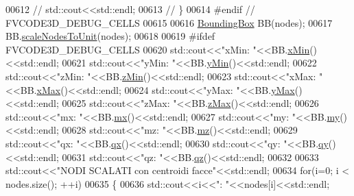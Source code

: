 \begin{DoxyCode}
00612 \textcolor{comment}{//            std::cout<<std::endl;}
00613 \textcolor{comment}{//        \}}
00614 \textcolor{preprocessor}{#endif // FVCODE3D\_DEBUG\_CELLS}
00615 
00616         \hyperlink{classFVCode3D_1_1BoundingBox}{BoundingBox} BB(nodes);
00617         BB.\hyperlink{classFVCode3D_1_1BoundingBox_a20d4281f025fd6a4ee51ec8cbc47874c}{scaleNodesToUnit}(nodes);
00618 
00619 \textcolor{preprocessor}{#ifdef FVCODE3D\_DEBUG\_CELLS}
00620         std::cout<<\textcolor{stringliteral}{"xMin: "}<<BB.\hyperlink{classFVCode3D_1_1BoundingBox_a8406e82493459d67f7c6e01c41401b01}{xMin}()<<std::endl;
00621         std::cout<<\textcolor{stringliteral}{"yMin: "}<<BB.\hyperlink{classFVCode3D_1_1BoundingBox_a8d241063de29672a73e478ccef500fcd}{yMin}()<<std::endl;
00622         std::cout<<\textcolor{stringliteral}{"zMin: "}<<BB.\hyperlink{classFVCode3D_1_1BoundingBox_a332192fde3727b7de1c9864e98659ac1}{zMin}()<<std::endl;
00623         std::cout<<\textcolor{stringliteral}{"xMax: "}<<BB.\hyperlink{classFVCode3D_1_1BoundingBox_a0ba4fbfa989d212c7f9df6b5ee440ef2}{xMax}()<<std::endl;
00624         std::cout<<\textcolor{stringliteral}{"yMax: "}<<BB.\hyperlink{classFVCode3D_1_1BoundingBox_abcec6a60efb3a0bd3333bba6cb8c5eb4}{yMax}()<<std::endl;
00625         std::cout<<\textcolor{stringliteral}{"zMax: "}<<BB.\hyperlink{classFVCode3D_1_1BoundingBox_a9b1fee0fe7324865743f4029dd06e1a3}{zMax}()<<std::endl;
00626         std::cout<<\textcolor{stringliteral}{"mx: "}<<BB.\hyperlink{classFVCode3D_1_1BoundingBox_a2afb68488fb7361595825089c271fa23}{mx}()<<std::endl;
00627         std::cout<<\textcolor{stringliteral}{"my: "}<<BB.\hyperlink{classFVCode3D_1_1BoundingBox_a286722e958824c1798a85a55325d9fe5}{my}()<<std::endl;
00628         std::cout<<\textcolor{stringliteral}{"mz: "}<<BB.\hyperlink{classFVCode3D_1_1BoundingBox_aaff1f6eb030c4f8a15dd22c79a28bf0c}{mz}()<<std::endl;
00629         std::cout<<\textcolor{stringliteral}{"qx: "}<<BB.\hyperlink{classFVCode3D_1_1BoundingBox_a6b6ca1d8e9bc92d6f5eebdb329577530}{qx}()<<std::endl;
00630         std::cout<<\textcolor{stringliteral}{"qy: "}<<BB.\hyperlink{classFVCode3D_1_1BoundingBox_ae429d21fd242df838ed0343757eba744}{qy}()<<std::endl;
00631         std::cout<<\textcolor{stringliteral}{"qz: "}<<BB.\hyperlink{classFVCode3D_1_1BoundingBox_accc6026eaa331a6075805479b60141f4}{qz}()<<std::endl;
00632 
00633         std::cout<<\textcolor{stringliteral}{"NODI SCALATI con centroidi facce"}<<std::endl;
00634         \textcolor{keywordflow}{for}(i=0; i < nodes.size(); ++i)
00635         \{
00636             std::cout<<i<<\textcolor{stringliteral}{": "}<<nodes[i]<<std::endl;

\end{DoxyCode}
